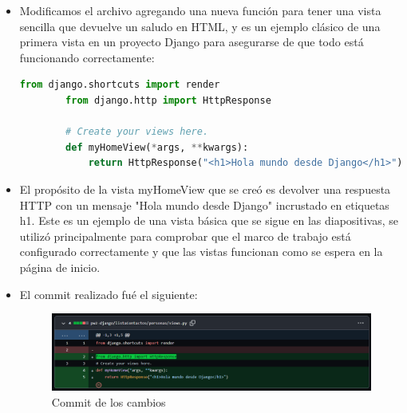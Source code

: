 \documentclass{article}
\begin{document}
\begin{itemize}
        \begin{lstlisting}[language=bash,caption={Ingresando a views.py}][H]
        $ vim inicio/views.py
        \end{lstlisting}
            \item Modificamos el archivo agregando una nueva función para tener una vista sencilla que devuelve un saludo en HTML, y es un ejemplo clásico de una primera vista en un proyecto Django para asegurarse de que todo está funcionando correctamente:

        \begin{lstlisting}[language=Python, caption={Respuesta HttpResponse de la vista myHomeView}]
        from django.shortcuts import render
        from django.http import HttpResponse
        
        # Create your views here.
        def myHomeView(*args, **kwargs):
            return HttpResponse("<h1>Hola mundo desde Django</h1>")
        \end{lstlisting}
            \item El propósito de la vista myHomeView que se creó es devolver una respuesta HTTP con un mensaje "Hola mundo desde Django" incrustado en etiquetas h1. Este es un ejemplo de una vista básica que se sigue en las diapositivas, se utilizó principalmente para comprobar que el marco de trabajo está configurado correctamente y que las vistas funcionan como se espera en la página de inicio.
            
            \item El commit realizado fué el siguiente:

        \begin{figure}[H]
            \centering
            \includegraphics[width=0.8\linewidth]{img/Vista.png}
            \caption{Commit de los cambios}
            \label{fig:enter-label}
        \end{figure}
        \end{itemize}
\end{document}
